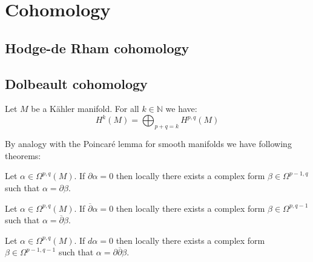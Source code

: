 \section{Cohomology}
\subsection{Hodge-de Rham cohomology}


\subsection{Dolbeault cohomology}
	
	\begin{theorem}
		Let $M$ be a K\"ahler manifold. For all $k\in\mathbb{N}$ we have:
		\begin{equation}
			H^k(M) = \bigoplus_{p+q=k}H^{p, q}(M)
		\end{equation}
	\end{theorem}
	
	By analogy with the Poincar\'e lemma for smooth manifolds we have following theorems:
	\begin{theorem}
		Let $\alpha\in\Omega^{p, q}(M)$. If $\partial\alpha = 0$ then locally there exists a complex form $\beta\in\Omega^{p-1, q}$ such that $\alpha = \partial\beta$.
	\end{theorem}
	\begin{theorem}
		Let $\alpha\in\Omega^{p, q}(M)$. If $\overline{\partial}\alpha = 0$ then locally there exists a complex form $\beta\in\Omega^{p, q-1}$ such that $\alpha = \overline{\partial}\beta$.
	\end{theorem}
	\begin{theorem}\label{complex:del_delbar_lemma}
		Let $\alpha\in\Omega^{p, q}(M)$. If $d\alpha = 0$ then locally there exists a complex form $\beta\in\Omega^{p-1, q-1}$ such that $\alpha = \partial\overline{\partial}\beta$.
	\end{theorem}
